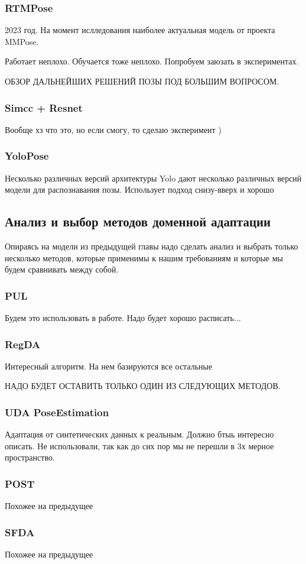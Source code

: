 \subsubsection{RTMPose}

2023 год. На момент ислледования наиболее актуальная модель от проекта MMPose.

Работает неплохо. Обучается тоже неплохо. Попробуем заюзать в экспериментах.

\hfill \break

ОБЗОР ДАЛЬНЕЙШИХ РЕШЕНИЙ ПОЗЫ ПОД БОЛЬШИМ ВОПРОСОМ.

\subsubsection{Simcc + Resnet}

Вообще хз что это, но если смогу, то сделаю эксперимент )

\subsubsection{YoloPose}

Несколько различных версий архитектуры Yolo дают несколько различных версий модели для распознавания позы. Использует подход снизу-вверх и хорошо


\subsection{Анализ и выбор методов доменной адаптации}
\label{sec:Chapter4_DA}

Опираясь на модели из предыдущей главы надо сделать анализ и выбрать только несколько методов, которые применимы к нашим требованиям и которые мы будем сравнивать между собой.

\subsubsection{PUL}

Будем это использовать в работе. Надо будет хорошо расписать...

\subsubsection{RegDA}

Интересный алгоритм. На нем базируются все остальные

\hfill \break

НАДО БУДЕТ ОСТАВИТЬ ТОЛЬКО ОДИН ИЗ СЛЕДУЮЩИХ МЕТОДОВ.

\subsubsection{UDA PoseEstimation}

Адаптация от синтетических данных к реальным. Должно бтыь интересно описать. Не использовали, так как до сих пор мы не перешли в 3х мерное пространство.

\subsubsection{POST}

Похожее на предыдущее

\subsubsection{SFDA}

Похожее на предыдущее


\newpage
